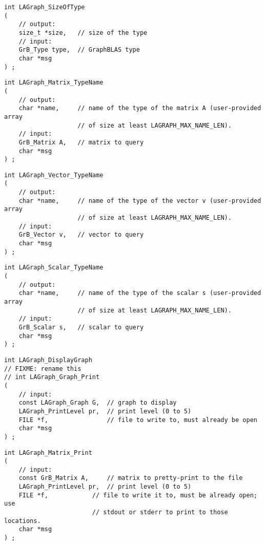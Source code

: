 \begin{verbatim}
int LAGraph_SizeOfType
(
    // output:
    size_t *size,   // size of the type
    // input:
    GrB_Type type,  // GraphBLAS type
    char *msg
) ;
\end{verbatim}




\begin{verbatim}
int LAGraph_Matrix_TypeName
(
    // output:
    char *name,     // name of the type of the matrix A (user-provided array
                    // of size at least LAGRAPH_MAX_NAME_LEN).
    // input:
    GrB_Matrix A,   // matrix to query
    char *msg
) ;
\end{verbatim}




\begin{verbatim}
int LAGraph_Vector_TypeName
(
    // output:
    char *name,     // name of the type of the vector v (user-provided array
                    // of size at least LAGRAPH_MAX_NAME_LEN).
    // input:
    GrB_Vector v,   // vector to query
    char *msg
) ;
\end{verbatim}




\begin{verbatim}
int LAGraph_Scalar_TypeName
(
    // output:
    char *name,     // name of the type of the scalar s (user-provided array
                    // of size at least LAGRAPH_MAX_NAME_LEN).
    // input:
    GrB_Scalar s,   // scalar to query
    char *msg
) ;
\end{verbatim}




\begin{verbatim}
int LAGraph_DisplayGraph
// FIXME: rename this
// int LAGraph_Graph_Print
(
    // input:
    const LAGraph_Graph G,  // graph to display
    LAGraph_PrintLevel pr,  // print level (0 to 5)
    FILE *f,                // file to write to, must already be open
    char *msg
) ;
\end{verbatim}




\begin{verbatim}
int LAGraph_Matrix_Print
(
    // input:
    const GrB_Matrix A,     // matrix to pretty-print to the file
    LAGraph_PrintLevel pr,  // print level (0 to 5)
    FILE *f,            // file to write it to, must be already open; use
                        // stdout or stderr to print to those locations.
    char *msg
) ;
\end{verbatim}




